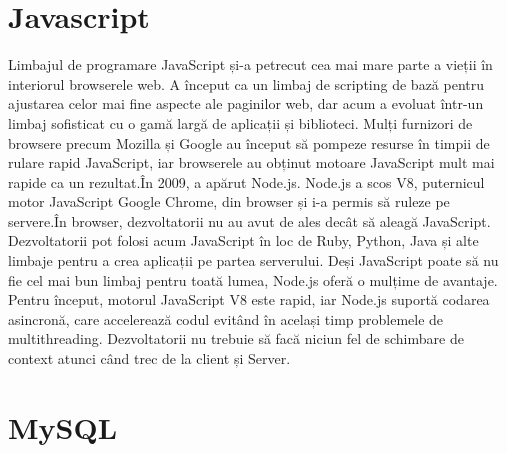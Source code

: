 \section{Javascript}
\label{sec:ch3sec2}

\par Limbajul de programare JavaScript și-a petrecut cea mai mare parte a vieții în interiorul browserele web. A început ca un limbaj de scripting de bază pentru ajustarea celor mai fine aspecte ale paginilor web, dar acum a evoluat într-un limbaj sofisticat cu o gamă largă de aplicații și biblioteci. Mulți furnizori de browsere precum Mozilla și Google au început să pompeze resurse în timpii de rulare rapid JavaScript, iar browserele au obținut motoare JavaScript mult mai rapide ca un rezultat.În 2009, a apărut Node.js. Node.js a scos V8, puternicul motor JavaScript Google Chrome, din browser și i-a permis să ruleze pe servere.În browser, dezvoltatorii nu au avut de ales decât să aleagă JavaScript. Dezvoltatorii pot folosi acum JavaScript în loc de Ruby, Python, Java și alte limbaje pentru a crea aplicații pe partea serverului. Deși JavaScript poate să nu fie cel mai bun limbaj pentru toată lumea, Node.js oferă o mulțime de avantaje. Pentru început, motorul JavaScript V8 este rapid, iar Node.js suportă codarea asincronă, care accelerează codul evitând în același timp problemele de multithreading. Dezvoltatorii nu trebuie să facă niciun fel de schimbare de context atunci când trec de la client și Server. 

\section{MySQL}
\label{sec:ch3sec3}

